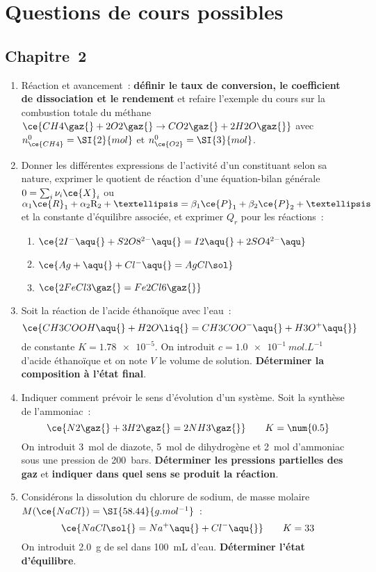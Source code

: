 \documentclass[a4paper, 12pt, final, garamond]{book}
\begin{document}
\section{Questions de cours possibles}
\subsection{Chapitre~2}
\begin{enumerate}
	\item Réaction et avancement~: \textbf{définir le taux de conversion,
		      le coefficient de dissociation et le rendement} et refaire l'exemple
	      du cours sur la combustion totale du méthane $\ce{CH4\gaz{} +
			      2O2\gaz{} \rightarrow CO2\gaz{} + 2H2O\gaz{}}$ avec $n_{\ce{CH4}}^0 =
		      \SI{2}{mol}$ et $n_{\ce{O2}}^0 = \SI{3}{mol}$.
	\item Donner les différentes expressions de l'activité d'un constituant
	      selon sa nature, exprimer le quotient de réaction d'une équation-bilan
	      générale $0=\sum_i \nu_i\ce{X}_i$ ou $\alpha_1\ce{R}_1 + \alpha_2{\rm
			      R}_2 + … = \beta_1\ce{P}_1 + \beta_2\ce{P}_2 + …$ et la constante
	      d'équilibre associée, et exprimer $Q_r$ pour les réactions~:
	      \begin{enumerate}
		      \item $\ce{2I^-\aqu{} + S2O8^{2-}\aqu{} = I2\aqu{} +2SO4^{2-}\aqu}$
		      \item $\ce{Ag+\aqu{} + Cl^-\aqu{} = AgCl\sol}$
		      \item $\ce{2FeCl3\gaz{} = Fe2Cl6\gaz{}}$
	      \end{enumerate}
	\item Soit la réaction de l'acide éthanoïque avec l'eau~:
	      \[\ce{CH3COOH\aqu{} + H2O\liq{} = CH3COO^{-}\aqu{} + H3O^{+}\aqu{}}\]
	      de constante $K = \num{1.78e-5}$. On introduit $c =
		      \SI{1.0e-1}{mol.L^{-1}}$ d'acide éthanoïque et on note $V$ le volume de
	      solution. \textbf{Déterminer la composition à l'état final}.

	\item Indiquer comment prévoir le sens d'évolution d'un système.
	      Soit la synthèse de l'ammoniac~:
	      \[
		      \ce{N2\gaz{} + 3H2\gaz{} = 2NH3\gaz{}}
		      \tag*{$K = \num{0.5}$}
	      \]
	      On introduit \SI{3}{mol} de diazote, \SI{5}{mol} de dihydrogène et
	      \SI{2}{mol} d'ammoniac sous une pression de \SI{200}{bars}.
	      \textbf{Déterminer les pressions partielles des gaz} et \textbf{indiquer
		      dans quel sens se produit la réaction}.
	\item Considérons la dissolution du chlorure de sodium, de masse molaire
	      $M(\ce{NaCl}) = \SI{58.44}{g.mol^{-1}}$~:
	      \[
		      \ce{NaCl\sol{} = Na^{+}\aqu{} + Cl^{-}\aqu{}}
		      \tag*{$K=33$}
	      \]
	      On introduit \SI{2.0}{g} de sel dans \SI{100}{mL} d'eau.
	      \textbf{Déterminer l'état d'équilibre}.


\end{enumerate}
\end{document}
